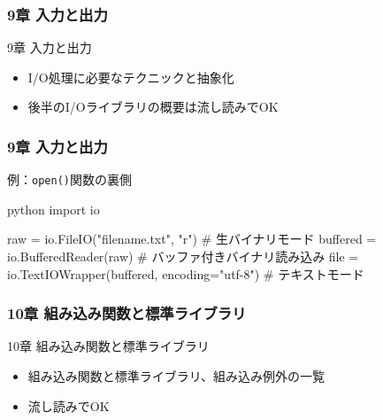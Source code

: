 \documentclass[aspectratio=169,dvipdfmx,12pt,notheorems]{beamer}
\theoremstyle{definition}
\begin{document}
\begin{frame}\frametitle{9章 入力と出力}

\begin{block}{9章 入力と出力}
\begin{itemize}
\item I/O処理に必要なテクニックと抽象化
\item 後半のI/Oライブラリの概要は流し読みでOK
\end{itemize}
\end{block}

\end{frame}

\begin{frame}[fragile]\frametitle{9章 入力と出力}

\begin{exampleblock}{例：\texttt{open()}関数の裏側}
\begin{pygments}{python}
import io

raw = io.FileIO("filename.txt", "r")  # 生バイナリモード
buffered = io.BufferedReader(raw)  # バッファ付きバイナリ読み込み
file = io.TextIOWrapper(buffered, encoding="utf-8")  # テキストモード
\end{pygments}
\end{exampleblock}

\end{frame}

\begin{frame}\frametitle{10章 組み込み関数と標準ライブラリ}

\begin{block}{10章 組み込み関数と標準ライブラリ}
\begin{itemize}
\item 組み込み関数と標準ライブラリ、組み込み例外の一覧
\item 流し読みでOK
\end{itemize}
\end{block}

\end{frame}
\end{document}
